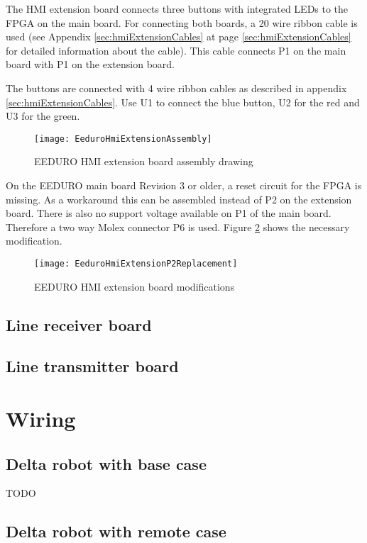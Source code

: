 The HMI extension board connects three buttons with integrated LEDs to the FPGA on the main board. For connecting both boards, a 20 wire ribbon cable is used (see Appendix \ref{sec:hmiExtensionCables} at page \ref{sec:hmiExtensionCables} for detailed information about the cable). This cable connects P1 on the main board with P1 on the extension board.

The buttons are connected with 4 wire ribbon cables as described in appendix \ref{sec:hmiExtensionCables}. Use U1 to connect the blue button, U2 for the red and U3 for the green.

\begin{figure}[htbp]
	\centering
	\texttt{[image: EeduroHmiExtensionAssembly]}
	\caption{EEDURO HMI extension board assembly drawing}
	\label{fig:EeduroHmiExtensionAssembly}
\end{figure}

On the EEDURO main board Revision 3 or older, a reset circuit for the FPGA is missing. As a workaround this can be assembled instead of P2 on the extension board. There is also no support voltage available on P1 of the main board. Therefore a two way Molex connector P6 is used. Figure \ref{fig:EeduroHmiExtensionP2Replacement} shows the necessary modification.

\begin{figure}[htbp]
	\centering
	\texttt{[image: EeduroHmiExtensionP2Replacement]}
	\caption{EEDURO HMI extension board modifications}
	\label{fig:EeduroHmiExtensionP2Replacement}
\end{figure}

\subsection{Line receiver board}

\subsection{Line transmitter board}

\section{Wiring}
\subsection{Delta robot with base case}
TODO

\subsection{Delta robot with remote case}

